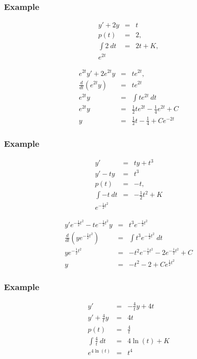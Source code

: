 \documentclass{beamer}
\newcommand{\half}{\mbox{$\frac{1}{2}$}}
\newcommand{\lp}{\left(}
\newcommand{\rp}{\right)}
\begin{document}
\begin{frame}
  \frametitle{Example}

  \vspace*{-3em}
  \begin{eqnarray*}
    y' + 2y & = & t \\
    p(t) & = & 2, \\
    \int 2 ~ dt & = & 2t + K, \\
    e^{2t} & & 
  \end{eqnarray*}

  \begin{eqnarray*}
    e^{2t} y' + 2 e^{2t} y & = & t e^{2t}, \\
    \frac{d}{dt} \lp e^{2t} y \rp & = & t e^{2t} \\
    e^{2t} y & = & \int t e^{2t} ~ dt \\
    e^{2t} y & = & \half t e^{2t} - \frac{1}{4} e^{2t} + C \\
    y & = & \half t - \frac{1}{4} + C e^{-2t}
  \end{eqnarray*}

\end{frame}



\begin{frame}
  \frametitle{Example}

  \vspace*{-3em}
  \begin{eqnarray*}
    y' & = & ty + t^3 \\
    y' - ty & = & t^3 \\
    p(t) & = & -t, \\
    \int -t ~ dt & = & -\half t^2 + K \\
    e^{-\half t^2} & & 
  \end{eqnarray*}

  \begin{eqnarray*}
    y' e^{-\half t^2} - t e^{-\half t^2} y & = & t^3 e^{-\half t^2} \\
    \frac{d}{dt} \lp y e^{-\half t^2} \rp & = & \int t^3 e^{-\half t^2} ~ dt \\
    y e^{-\half t^2} & = & -t^2 e^{-\half t^2} - 2 e^{-\half t^2} + C \\
    y & = & -t^2 - 2 + C e^{\half t^2}
  \end{eqnarray*}

\end{frame}



\begin{frame}
  \frametitle{Example}

  \begin{eqnarray*}
    y' & = & -\frac{4}{t} y + 4 t \\
    y' + \frac{4}{t} y & = & 4 t \\
    p(t) & = & \frac{4}{t} \\
    \int \frac{4}{t} ~ dt & = & 4 \ln(t) + K \\
    e^{4 \ln(t) } & = & t^4
  \end{eqnarray*}

\end{frame}
\end{document}
